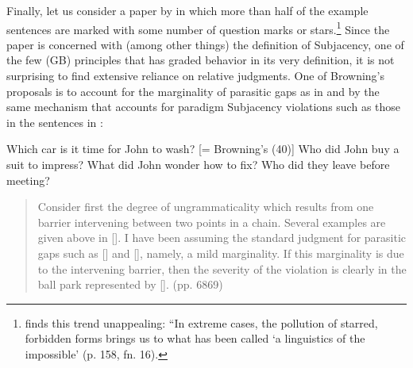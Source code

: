 Finally, let us consider a paper by \citet{Browning1987} in which more than half of the example sentences are marked with some number of question marks or stars.\footnote{\citet{Hagege1981} finds this trend unappealing: ``In extreme cases, the pollution of starred, forbidden forms brings us to what has been called `a linguistics of the impossible'{\textquotedbl} (p. 158, fn. 16).}
 Since the paper is concerned with (among other things) the definition of Subjacency, one of the few  (GB) principles that has graded
behavior in its very definition, it is not surprising to find extensive reliance on relative judgments. One of Browning's proposals is to account for the marginality of parasitic gaps as in  and  by the same mechanism that accounts for paradigm Subjacency violations such as those in the sentences in :


\label{ex:2:11}
   \z


\label{ex:2:12}
\z

\ea \label{ex:2:13}
\ea
Which car is it time for John to wash? [= Browning's (40)]
\ex Who did John buy a suit to impress?
\ex What did John wonder how to fix?
\ex Who did they leave before meeting?\\
\z
\z

\begin{quote}
Consider first the degree of ungrammaticality which results from one barrier intervening between two points in a chain. Several examples are given above in []. I have been assuming the standard judgment for parasitic gaps such as [] and [], namely, a mild marginality. If this marginality is due to the intervening barrier, then the severity of the violation is clearly in the ball park represented by []. (pp. 68\textendash{}69)
\end{quote}

